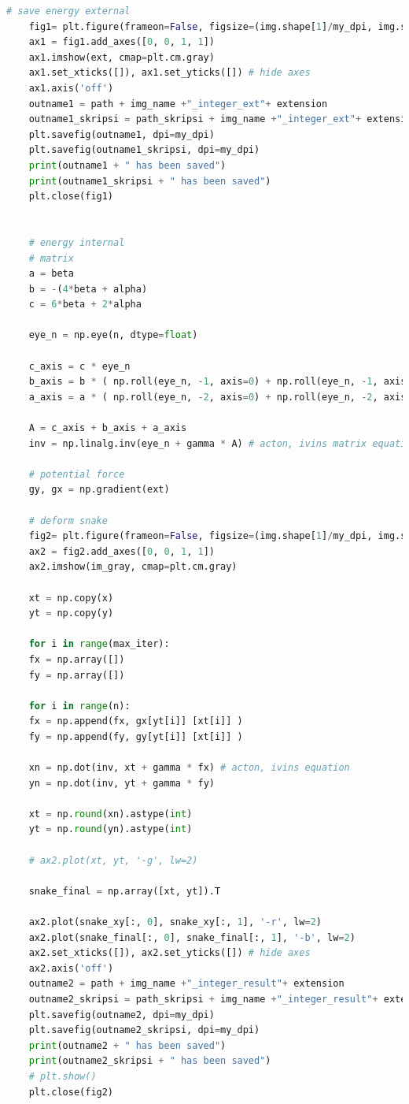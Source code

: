 \begin{lstlisting}[language=Python, basicstyle=\tiny]
	# save energy external
	fig1= plt.figure(frameon=False, figsize=(img.shape[1]/my_dpi, img.shape[0]/my_dpi), dpi=my_dpi)
	ax1 = fig1.add_axes([0, 0, 1, 1])
	ax1.imshow(ext, cmap=plt.cm.gray)
	ax1.set_xticks([]), ax1.set_yticks([]) # hide axes
	ax1.axis('off')
	outname1 = path + img_name +"_integer_ext"+ extension
	outname1_skripsi = path_skripsi + img_name +"_integer_ext"+ extension
	plt.savefig(outname1, dpi=my_dpi)
	plt.savefig(outname1_skripsi, dpi=my_dpi)
	print(outname1 + " has been saved")
	print(outname1_skripsi + " has been saved")
	plt.close(fig1)
	
	
	# energy internal
	# matrix
	a = beta
	b = -(4*beta + alpha)
	c = 6*beta + 2*alpha
	
	eye_n = np.eye(n, dtype=float)
	
	c_axis = c * eye_n
	b_axis = b * ( np.roll(eye_n, -1, axis=0) + np.roll(eye_n, -1, axis=1) )
	a_axis = a * ( np.roll(eye_n, -2, axis=0) + np.roll(eye_n, -2, axis=1) )
	
	A = c_axis + b_axis + a_axis
	inv = np.linalg.inv(eye_n + gamma * A) # acton, ivins matrix equation
	
	# potential force
	gy, gx = np.gradient(ext)
	
	# deform snake
	fig2= plt.figure(frameon=False, figsize=(img.shape[1]/my_dpi, img.shape[0]/my_dpi), dpi=my_dpi)
	ax2 = fig2.add_axes([0, 0, 1, 1])
	ax2.imshow(im_gray, cmap=plt.cm.gray)
	
	xt = np.copy(x)
	yt = np.copy(y)
	
	for i in range(max_iter):
	fx = np.array([])
	fy = np.array([])
	
	for i in range(n):
	fx = np.append(fx, gx[yt[i]] [xt[i]] )
	fy = np.append(fy, gy[yt[i]] [xt[i]] )
	
	xn = np.dot(inv, xt + gamma * fx) # acton, ivins equation
	yn = np.dot(inv, yt + gamma * fy)
	
	xt = np.round(xn).astype(int)
	yt = np.round(yn).astype(int)
	
	# ax2.plot(xt, yt, '-g', lw=2)
	
	snake_final = np.array([xt, yt]).T
	
	ax2.plot(snake_xy[:, 0], snake_xy[:, 1], '-r', lw=2)
	ax2.plot(snake_final[:, 0], snake_final[:, 1], '-b', lw=2)
	ax2.set_xticks([]), ax2.set_yticks([]) # hide axes
	ax2.axis('off')
	outname2 = path + img_name +"_integer_result"+ extension
	outname2_skripsi = path_skripsi + img_name +"_integer_result"+ extension
	plt.savefig(outname2, dpi=my_dpi)
	plt.savefig(outname2_skripsi, dpi=my_dpi)
	print(outname2 + " has been saved")
	print(outname2_skripsi + " has been saved")
	# plt.show()
	plt.close(fig2)
	

\end{lstlisting}
